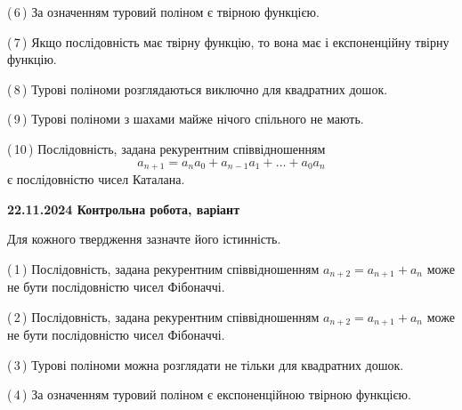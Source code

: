 \documentclass[12pt, ukrainian]{article}
\begin{document}
\begin {large}
\begin {large}
\begin {large}
\begin {large}
\begin {large}
\begin {large}
\begin {large}
\begin {large}
\begin {large}
\begin {large}
\begin {large}
\begin {large}
\begin {large}
\begin {large}
\begin {large}
\begin {large}
\begin {large}
\begin {large}
\begin {large}
\begin {large}
\begin {large}
\begin {large}
\begin {large}
\begin {large}
\begin {large}
\begin {large}
\begin {large}
\begin {large}
\begin {large}
\begin {large}
\begin {large}
\begin {large}
\begin {large}
\begin {large}
\begin {large}
\begin {large}
\begin {large}
\begin {large}
\begin {large}
{(\,6\,) За означенням туровий поліном є твірною функцією.%



(\,7\,) Якщо послідовність має твірну функцію, то вона має і експоненційну твірну функцію.%



(\,8\,) Турові поліноми розглядаються виключно для квадратних дошок.%



(\,9\,) Турові поліноми з шахами майже нічого спільного не мають.%



(\,10\,) Послідовність, задана рекурентним співвідношенням $$a_{n+1}=a_{n}a_{0}+a_{n-1}a_{1}+\ldots+a_0a_{n}$$ є послідовністю чисел Каталана.%




\vspace{5mm}
}
\newpage

\begin {large}

\textbf{22.11.2024 Контрольна робота, варіант  }\par


{
Для кожного твердження зазначте його істинність.\par

\vspace{2mm}

(\,1\,) Послідовність, задана рекурентним співвідношенням $a_{n+2}=a_{n+1}+a_{n}$ може не бути послідовністю чисел Фібоначчі.%



(\,2\,) Послідовність, задана рекурентним співвідношенням $a_{n+2}=a_{n+1}+a_{n}$ може не бути послідовністю чисел Фібоначчі.%



(\,3\,) Турові поліноми можна розглядати не тільки для квадратних дошок.%



(\,4\,) За означенням туровий поліном є експоненційною твірною функцією.%



}
\end{large}
\end{large}
\end{large}
\end{large}
\end{large}
\end{large}
\end{large}
\end{large}
\end{large}
\end{large}
\end{large}
\end{large}
\end{large}
\end{large}
\end{large}
\end{large}
\end{large}
\end{large}
\end{large}
\end{large}
\end{large}
\end{large}
\end{large}
\end{large}
\end{large}
\end{large}
\end{large}
\end{large}
\end{large}
\end{large}
\end{large}
\end{large}
\end{large}
\end{large}
\end{large}
\end{large}
\end{large}
\end{large}
\end{large}
\end{large}
\end{document}
